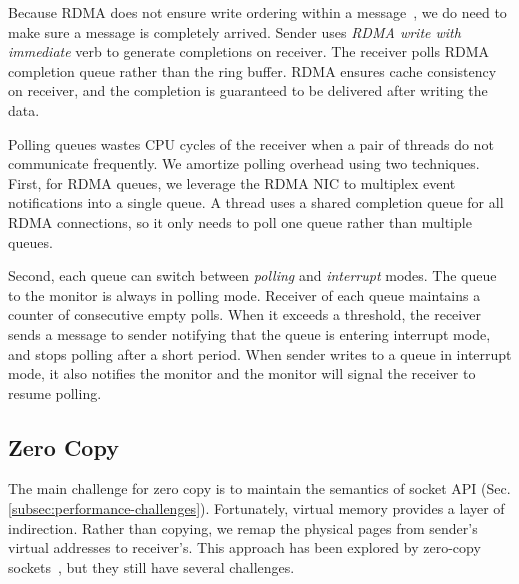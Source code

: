 Because RDMA does not ensure write ordering within a message~\cite{infiniband2000infiniband}, we do need to make sure a message is completely arrived. Sender uses \textit{RDMA write with immediate} verb to generate completions on receiver. The receiver polls RDMA completion queue rather than the ring buffer. RDMA ensures cache consistency on receiver, and the completion is guaranteed to be delivered after writing the data.


Polling queues wastes CPU cycles of the receiver when a pair of threads do not communicate frequently. We amortize polling overhead using two techniques.
First, for RDMA queues, we leverage the RDMA NIC to multiplex event notifications into a single queue.
A thread uses a shared completion queue for all RDMA connections, so it only needs to poll one queue rather than multiple queues.

Second, each queue can switch between \textit{polling} and \textit{interrupt} modes. The queue to the monitor is always in polling mode. Receiver of each queue maintains a counter of consecutive empty polls. When it exceeds a threshold, the receiver sends a message to sender notifying that the queue is entering interrupt mode, and stops polling after a short period. When sender writes to a queue in interrupt mode, it also notifies the monitor and the monitor will signal the receiver to resume polling.


\subsection{Zero Copy}
\label{subsec:zerocopy}


The main challenge for zero copy is to maintain the semantics of socket API (Sec.\ref{subsec:performance-challenges}).
Fortunately, virtual memory provides a layer of indirection. %
Rather than copying, we remap the physical pages from sender's virtual addresses to receiver's.
This approach has been explored by zero-copy sockets~\cite{thadani1995efficient,chu1996zero,linux-zero-copy}, but they still have several challenges.

